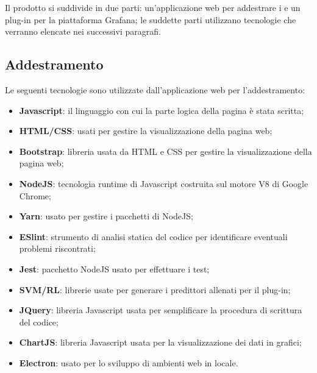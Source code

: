 \documentclass[../manuale-sviluppatore.tex]{subfiles}
\begin{document}
Il prodotto si suddivide in due parti: un'applicazione web per addestrare i  e un plug-in per la piattaforma Grafana; le suddette parti utilizzano tecnologie che verranno elencate nei successivi paragrafi.

\subsection{Addestramento}%
\label{subs:addestramento}
Le seguenti tecnologie sono utilizzate dall'applicazione web per l'addestramento:
\begin{itemize}
  \item \textbf{Javascript}: il linguaggio con cui la parte logica della pagina è stata scritta;
  \item \textbf{HTML/CSS}: usati per gestire la visualizzazione della pagina web;
  \item \textbf{Bootstrap}: libreria usata da HTML e CSS per gestire la visualizzazione della pagina web;
  \item \textbf{NodeJS}: tecnologia runtime di Javascript costruita sul motore V8 di Google Chrome;
  \item \textbf{Yarn}: usato per gestire i pacchetti di NodeJS;
  \item \textbf{ESlint}: strumento di analisi statica del codice per identificare eventuali problemi riscontrati;
  \item \textbf{Jest}: pacchetto NodeJS usato per effettuare i test;
  \item \textbf{SVM/RL}: librerie usate per generare i predittori allenati per il plug-in;
  \item \textbf{JQuery}: libreria Javascript usata per semplificare la procedura di scrittura del codice;
  \item \textbf{ChartJS}: libreria Javascript usata per la visualizzazione dei dati in grafici;
  \item \textbf{Electron}: usato per lo sviluppo di ambienti web in locale.
\end{itemize}
\end{document}
